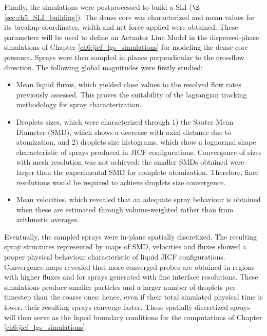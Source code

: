 Finally, the simulations were postprocessed to build a SLI ($\S$\ref{sec:ch5_SLI_building}). The dense core was characterized and mean values for its breakup coordinates, width and net force applied were obtained. These parameters will be used to define an Actuator Line Model in the dispersed-phase simulations of Chapter \ref{ch6:jicf_lgs_simulations} for modeling the dense core presence.  Sprays were then sampled in planes perpendicular to the crossflow direction. The following global magnitudes were firstly studied:

\begin{itemize}

	\item Mean liquid fluxes, which yielded close values to the resolved flow rates previously assessed. This proves the suitability of the lagrangian tracking methodology for spray characterization.
	
	\vspace*{-0.05in}
	
	\item Droplets sizes, which were characterized through 1) the Sauter Mean Diameter (SMD), which shows a decrease with axial distance due to atomization, and 2) droplets size histograms, which show a lognormal shape characteristic of sprays produced in JICF configurations. Convergence of sizes with mesh resolution was not achieved: the smaller SMDs obtained were larger than the experimental SMD for complete atomization. Therefore, finer resolutions would be required to achieve droplets size convergence. %
	
	\vspace*{-0.05in}
	
	\item Mean velocities, which revealed that an adequate spray behaviour is obtained when these are estimated through volume-weighted rather than from arithmetic averages.

\end{itemize}

Eventually, the sampled sprays were in-plane spatially discretized. The resulting spray structures represented by maps of SMD, velocities and fluxes showed a proper physical behaviour characteristic of liquid JICF configurations. Convergence maps revealed that more converged probes are obtained in regions with higher fluxes and for sprays generated with fine interface resolutions. These simulations produce smaller particles and a larger number of droplets per timestep than the coarse ones: hence, even if their total simulated physical time is lower, their resulting sprays converge faster. These spatially discretized sprays will then serve as the liquid boundary conditions for the computations of Chapter \ref{ch6:jicf_lgs_simulations}.


